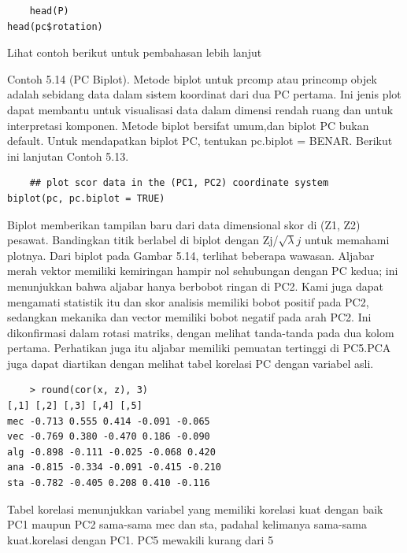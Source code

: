 \documentclass[a4paper,12pt]{article}
\theoremstyle{definition}
\begin{document}
\begin{lstlisting}
    head(P)
head(pc$rotation)

\end{lstlisting}

Lihat contoh berikut untuk pembahasan lebih lanjut

Contoh 5.14 (PC Biplot). Metode biplot untuk prcomp atau princomp objek adalah sebidang data dalam sistem koordinat dari dua PC pertama. Ini jenis plot dapat membantu untuk visualisasi data dalam dimensi rendah ruang dan untuk interpretasi komponen. Metode biplot bersifat umum,dan biplot PC bukan default. Untuk mendapatkan biplot PC, tentukan pc.biplot = BENAR. Berikut ini lanjutan Contoh 5.13.

\begin{lstlisting}
    ## plot scor data in the (PC1, PC2) coordinate system
biplot(pc, pc.biplot = TRUE)

\end{lstlisting}

Biplot memberikan tampilan baru dari data dimensional skor di (Z1, Z2) pesawat. Bandingkan titik berlabel di biplot dengan Zj/$ \sqrt{\lambda }j$ untuk memahami plotnya.
Dari biplot pada Gambar 5.14, terlihat beberapa wawasan. Aljabar merah vektor memiliki kemiringan hampir nol sehubungan dengan PC kedua; ini menunjukkan bahwa aljabar hanya berbobot ringan di PC2. Kami juga dapat mengamati statistik itu dan skor analisis memiliki bobot positif pada PC2, sedangkan mekanika dan vector memiliki bobot negatif pada arah PC2. Ini dikonfirmasi dalam rotasi matriks, dengan melihat tanda-tanda pada dua kolom pertama. Perhatikan juga itu aljabar memiliki pemuatan tertinggi di PC5.PCA juga dapat diartikan dengan melihat tabel korelasi PC dengan variabel asli.

\begin{lstlisting}
    > round(cor(x, z), 3)
[,1] [,2] [,3] [,4] [,5]
mec -0.713 0.555 0.414 -0.091 -0.065
vec -0.769 0.380 -0.470 0.186 -0.090
alg -0.898 -0.111 -0.025 -0.068 0.420
ana -0.815 -0.334 -0.091 -0.415 -0.210
sta -0.782 -0.405 0.208 0.410 -0.116
\end{lstlisting}

Tabel korelasi menunjukkan variabel yang memiliki korelasi kuat dengan baik PC1 maupun PC2 sama-sama mec dan sta, padahal kelimanya sama-sama kuat.korelasi dengan PC1. PC5 mewakili kurang dari 5%
\end{document}
